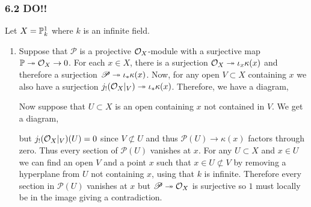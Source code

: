 \documentclass[12pt]{article}
\begin{document}
\subsubsection{6.2 DO!!}

Let $X = \P^1_k$ where $k$ is an infinite field.

\newcommand{\sP}{\mathscr{P}}

\begin{enumerate}
\item Suppose that $\sP$ is a projective $\struct{X}$-module with a surjective map $\P \onto \struct{X} \to 0$. For each $x \in X$, there is a surjection $\struct{X} \onto \iota_x \kappa(x)$ and therefore a surjection $\sP \onto \iota_* \kappa(x)$. Now, for any open $V \subset X$ containing $x$ we also have a surjection $j_! (\struct{X}|_V) \onto \iota_* \kappa(x)$. Therefore, we have a diagram,
\begin{center}
\end{center}
Now suppose that $U \subset X$ is an open containing $x$ not contained in $V$. We get a diagram,
\begin{center}
\end{center}
but $j_!(\struct{X}|_V)(U) = 0$ since $V \not\subset U$ and thus $\sP(U) \to \kappa(x)$ factors through zero. Thus every section of $\sP(U)$ vanishes at $x$. For any $U \subset X$ and $x \in U$ we can find an open $V$ and a point $x$ such that $x \in U \not\subset V$ by removing a hyperplane from $U$ not containing $x$, using that $k$ is infinite. Therefore every section in $\sP(U)$ vanishes at $x$ but $\sP \onto \struct{X}$ is surjective so $1$ must locally be in the image giving a contradiction.


\end{enumerate}
\end{document}
